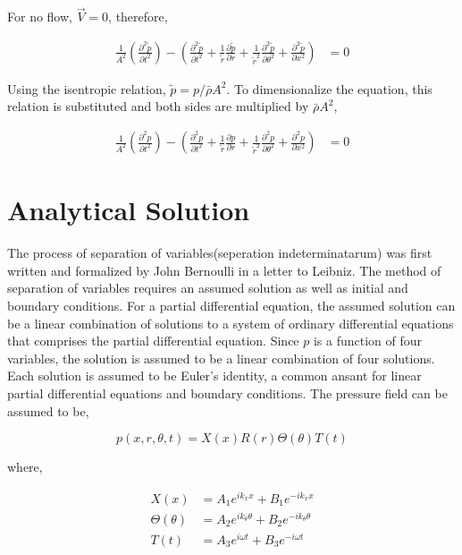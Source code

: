 \documentclass[a4paper]{article}
\begin{document}
For no flow, $\vec{V} = 0$, therefore,

\begin{align*} 
    \frac{1}{A^2}\left(
        \frac{\partial^2 \tilde{p}}{\partial t^2}
    \right) - 
        \left(
            \frac{\partial^2 \tilde{p}}{\partial t^2} + 
            \frac{1}{\tilde{r}}\frac{\partial \tilde{p}}{\partial  r}  +
            \frac{1}{\tilde{r}^2} \frac{\partial^2 \tilde{p}}{\partial \theta^2} + 
            \frac{\partial^2 \tilde{p}}{\partial x^2} 
        \right) &= 0  
\end{align*} 

Using the isentropic relation, $\tilde{p} = p/\bar{\rho} A^2$. 
To dimensionalize the equation, this relation is substituted and both sides 
are multiplied by $\bar{\rho}A^2$,


\begin{align*} 
    \frac{1}{A^2}\left(
        \frac{\partial^2 {p}}{\partial t^2}
    \right) - 
        \left(
            \frac{\partial^2 {p}}{\partial t^2} + 
            \frac{1}{\tilde{r}}\frac{\partial p}{\partial r} +
            \frac{1}{\tilde{r}^2} \frac{\partial^2 p}{\partial \theta^2} + 
            \frac{\partial^2 p}{\partial x^2} 
        \right) &= 0  
\end{align*} 
\section{Analytical Solution}
The process of separation of variables(seperation indeterminatarum) was first written and formalized by John Bernoulli in a letter to Leibniz. The method
of separation of variables requires an assumed solution as well as initial and boundary 
conditions. For a partial differential equation, the assumed solution can be a 
linear combination of solutions to a system of ordinary differential equations that
comprises the partial differential equation. Since $p$ is a function of four
variables, the solution is assumed to be a linear combination of four solutions.
Each solution is assumed to be Euler's identity, a common ansant for linear partial 
differential equations and boundary conditions.  The pressure field can be assumed to be,

\begin{equation}
    p(x,r,\theta,t) = X(x) R(r) \Theta(\theta) T(t)
\end{equation}

where, 

\begin{align*}
    X(x) &=
    A_1 e^{ik_x x} +
    B_1 e^{-ik_x x }\\
    \Theta(\theta) &=
    A_2 e^{i k_{\theta} \theta } +
    B_2 e^{-ik_{\theta} \theta }\\
    T(t) &=
    A_3 e^{i \omega t } +
    B_3 e^{-i\omega t  }
\end{align*}
\end{document}
